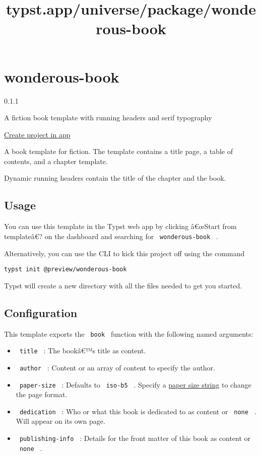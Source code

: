 \title{typst.app/universe/package/wonderous-book}

\label{banner}
\label{template-thumbnail}

\section{wonderous-book}\label{wonderous-book}

{ 0.1.1 }

A fiction book template with running headers and serif typography

\href{/app?template=wonderous-book&version=0.1.1}{Create project in app}

\label{readme}
A book template for fiction. The template contains a title page, a table
of contents, and a chapter template.

Dynamic running headers contain the title of the chapter and the book.

\subsection{Usage}\label{usage}

You can use this template in the Typst web app by clicking â€œStart from
templateâ€? on the dashboard and searching for
\texttt{\ wonderous-book\ } .

Alternatively, you can use the CLI to kick this project off using the
command

\begin{verbatim}
typst init @preview/wonderous-book
\end{verbatim}

Typst will create a new directory with all the files needed to get you
started.

\subsection{Configuration}\label{configuration}

This template exports the \texttt{\ book\ } function with the following
named arguments:

\begin{itemize}
\tightlist
\item
  \texttt{\ title\ } : The bookâ€™s title as content.
\item
  \texttt{\ author\ } : Content or an array of content to specify the
  author.
\item
  \texttt{\ paper-size\ } : Defaults to \texttt{\ iso-b5\ } . Specify a
  \href{https://typst.app/docs/reference/layout/page/\#parameters-paper}{paper
  size string} to change the page format.
\item
  \texttt{\ dedication\ } : Who or what this book is dedicated to as
  content or \texttt{\ none\ } . Will appear on its own page.
\item
  \texttt{\ publishing-info\ } : Details for the front matter of this
  book as content or \texttt{\ none\ } .
\end{itemize}

